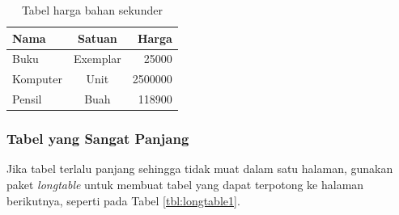 \begin{table}[t] %
	\begin{tabular}{ | l | c | r | }
	\hline
	Nama 	& Satuan 		& Harga \\
	\hline
	Buku 	& Exemplar	& 25000 \\
	Komputer	& Unit		& 2500000 \\
	Pensil	& Buah		& 118900 \\
	\hline
	\end{tabular}
\caption{Tabel harga bahan sekunder}
\label{tbl:harga2}
\end{table}

\subsubsection{Tabel yang Sangat Panjang}
Jika tabel terlalu panjang sehingga tidak muat dalam satu halaman, gunakan paket 
\textit{longtable} untuk membuat tabel yang dapat terpotong ke halaman berikutnya, 
seperti pada Tabel \ref{tbl:longtable1}.

